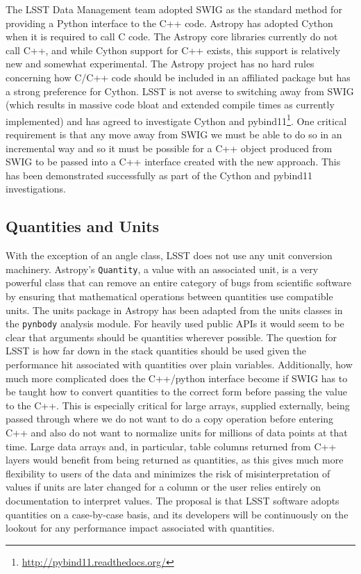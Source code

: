 \documentclass[]{spie}  %
\begin{document}
The LSST Data Management team adopted SWIG as the standard method for providing a Python interface to the C++ code.
Astropy has adopted Cython\cite{2010/content/aip/journal/cise/13/2/10.1109/MCSE.2010.118} when it is required to call C code.
The Astropy core libraries currently do not call C++, and while Cython support for C++ exists, this support is relatively new and somewhat experimental.
The Astropy project has no hard rules concerning how C/C++ code should be included in an affiliated package but has a strong preference for Cython.
LSST is not averse to switching away from SWIG (which results in massive code bloat and extended compile times as currently implemented) and has agreed to investigate Cython\cite{dmtn-013} and pybind11\cite{dmtn-014}\footnote{\url{http://pybind11.readthedocs.org/}}.
One critical requirement is that any move away from SWIG we must be able to do so in an incremental way and so it must be possible for a C++ object produced from SWIG to be passed into a C++ interface created with the new approach.
This has been demonstrated successfully as part of the Cython and pybind11 investigations.

\subsection{Quantities and Units}

With the exception of an angle class, LSST does not use any unit conversion machinery.
Astropy's \texttt{Quantity}, a value with an associated unit, is a very powerful class that can remove an entire category of bugs from scientific software by ensuring that mathematical operations between quantities use compatible units.
The units package in Astropy has been adapted from the units classes in the \texttt{pynbody} analysis module\cite{pynbody}.
For heavily used public APIs it would seem to be clear that arguments should be quantities wherever possible.
The question for LSST is how far down in the stack quantities should be used given the performance hit associated with quantities over plain variables.
Additionally, how much more complicated does the C++/python interface become if SWIG has to be taught how to convert quantities to the correct form before passing the value to the C++.
This is especially critical for large arrays, supplied externally, being passed through where we do not want to do a copy operation before entering C++ and also do not want to normalize units for millions of data points at that time.
Large data arrays and, in particular, table columns returned from C++ layers would benefit from being returned as quantities, as this gives much more flexibility to users of the data and minimizes the risk of misinterpretation of values if units are later changed for a column or the user relies entirely on documentation to interpret values.
The proposal is that LSST software adopts quantities on a case-by-case basis, and its developers will be continuously on the lookout for any performance impact associated with quantities.
\end{document}
